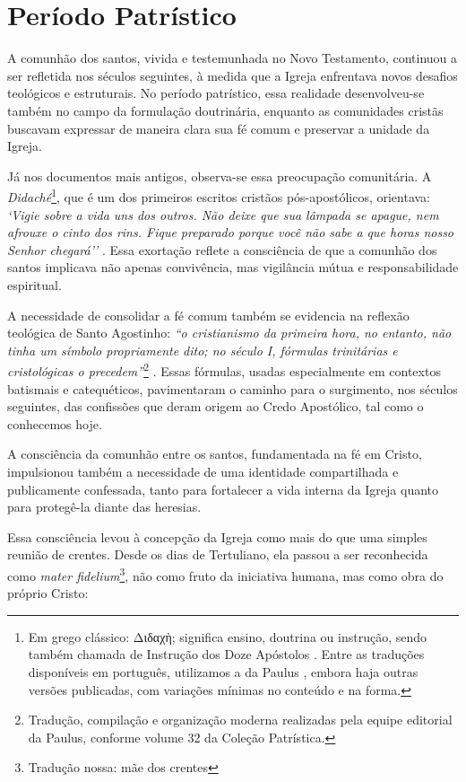 \section{Período Patrístico}

A comunhão dos santos, vivida e testemunhada no Novo Testamento, continuou a ser refletida nos séculos seguintes, à medida que a Igreja enfrentava novos desafios teológicos e estruturais. No período patrístico, essa realidade desenvolveu-se também no campo da formulação doutrinária, enquanto as comunidades cristãs buscavam expressar de maneira clara sua fé comum e preservar a unidade da Igreja.

Já nos documentos mais antigos, observa-se essa preocupação comunitária. A \textit{Didaché}\footnote{Em grego clássico: \foreignlanguage{greek}{Διδαχὴ}; significa ensino, doutrina ou instrução, sendo também chamada de Instrução dos Doze Apóstolos \cite{wikididaque}. Entre as traduções disponíveis em português, utilizamos a da Paulus \cite{didachePaulus2013}, embora haja outras versões publicadas, com variações mínimas no conteúdo e na forma.}, que é um dos primeiros escritos cristãos pós-apostólicos, orientava: \textit{`Vigie sobre a vida uns dos outros. Não deixe que sua lâmpada se apague, nem afrouxe o cinto dos rins. Fique preparado porque você não sabe a que horas nosso Senhor chegará''} \cite{didachePaulus2013}. Essa exortação reflete a consciência de que a comunhão dos santos implicava não apenas convivência, mas vigilância mútua e responsabilidade espiritual.

A necessidade de consolidar a fé comum também se evidencia na reflexão teológica de Santo Agostinho: \textit{``o cristianismo da primeira hora, no entanto, não tinha um símbolo propriamente dito; no século I, fórmulas trinitárias e cristológicas o precedem''}\footnote{Tradução, compilação e organização moderna realizadas pela equipe editorial da Paulus, conforme volume 32 da Coleção Patrística.} \cite[p.~8]{santos2013}. Essas fórmulas, usadas especialmente em contextos batismais e catequéticos, pavimentaram o caminho para o surgimento, nos séculos seguintes, das confissões que deram origem ao Credo Apostólico, tal como o conhecemos hoje.

A consciência da comunhão entre os santos, fundamentada na fé em Cristo, impulsionou também a necessidade de uma identidade compartilhada e publicamente confessada, tanto para fortalecer a vida interna da Igreja quanto para protegê-la diante das heresias.

Essa consciência levou à concepção da Igreja como mais do que uma simples reunião de crentes. Desde os dias de Tertuliano, ela passou a ser reconhecida como \textit{mater fidelium}\footnote{Tradução nossa: mãe dos crentes}, não como fruto da iniciativa humana, mas como obra do próprio Cristo:

